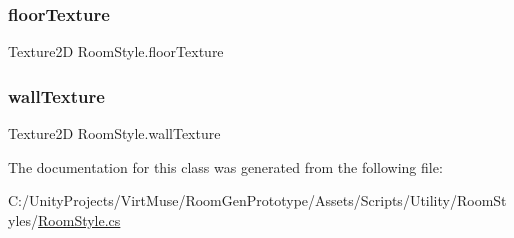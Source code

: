 \mbox{\label{class_room_style_a0115dc57b9a052d8130987bc75d9e068}} 
\subsubsection{\texorpdfstring{floor\+Texture}{floorTexture}}
{\footnotesize\ttfamily Texture2D Room\+Style.\+floor\+Texture}

\mbox{\label{class_room_style_afcc5e2058831aa7e50a3bd0cdcbb7b08}} 
\subsubsection{\texorpdfstring{wall\+Texture}{wallTexture}}
{\footnotesize\ttfamily Texture2D Room\+Style.\+wall\+Texture}



The documentation for this class was generated from the following file\+:\begin{DoxyCompactItemize}
\item 
C\+:/\+Unity\+Projects/\+Virt\+Muse/\+Room\+Gen\+Prototype/\+Assets/\+Scripts/\+Utility/\+Room\+Styles/\mbox{\hyperlink{_room_styles_2_room_style_8cs}{Room\+Style.\+cs}}\end{DoxyCompactItemize}
